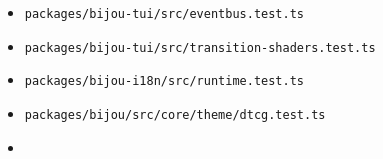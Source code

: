 \begin{itemize}
\begin{itemize}
  \item
    \texttt{p\allowbreak{}a\allowbreak{}c\allowbreak{}k\allowbreak{}a\allowbreak{}g\allowbreak{}e\allowbreak{}s\allowbreak{}/\allowbreak{}b\allowbreak{}i\allowbreak{}j\allowbreak{}o\allowbreak{}u\allowbreak{}-\allowbreak{}t\allowbreak{}u\allowbreak{}i\allowbreak{}/\allowbreak{}s\allowbreak{}r\allowbreak{}c\allowbreak{}/\allowbreak{}e\allowbreak{}v\allowbreak{}e\allowbreak{}n\allowbreak{}t\allowbreak{}b\allowbreak{}u\allowbreak{}s\allowbreak{}.\allowbreak{}t\allowbreak{}e\allowbreak{}s\allowbreak{}t\allowbreak{}.\allowbreak{}t\allowbreak{}s}
  \item
    \texttt{p\allowbreak{}a\allowbreak{}c\allowbreak{}k\allowbreak{}a\allowbreak{}g\allowbreak{}e\allowbreak{}s\allowbreak{}/\allowbreak{}b\allowbreak{}i\allowbreak{}j\allowbreak{}o\allowbreak{}u\allowbreak{}-\allowbreak{}t\allowbreak{}u\allowbreak{}i\allowbreak{}/\allowbreak{}s\allowbreak{}r\allowbreak{}c\allowbreak{}/\allowbreak{}t\allowbreak{}r\allowbreak{}a\allowbreak{}n\allowbreak{}s\allowbreak{}i\allowbreak{}t\allowbreak{}i\allowbreak{}o\allowbreak{}n\allowbreak{}-\allowbreak{}s\allowbreak{}h\allowbreak{}a\allowbreak{}d\allowbreak{}e\allowbreak{}r\allowbreak{}s\allowbreak{}.\allowbreak{}t\allowbreak{}e\allowbreak{}s\allowbreak{}t\allowbreak{}.\allowbreak{}t\allowbreak{}s}
  \item
    \texttt{p\allowbreak{}a\allowbreak{}c\allowbreak{}k\allowbreak{}a\allowbreak{}g\allowbreak{}e\allowbreak{}s\allowbreak{}/\allowbreak{}b\allowbreak{}i\allowbreak{}j\allowbreak{}o\allowbreak{}u\allowbreak{}-\allowbreak{}i\allowbreak{}1\allowbreak{}8\allowbreak{}n\allowbreak{}/\allowbreak{}s\allowbreak{}r\allowbreak{}c\allowbreak{}/\allowbreak{}r\allowbreak{}u\allowbreak{}n\allowbreak{}t\allowbreak{}i\allowbreak{}m\allowbreak{}e\allowbreak{}.\allowbreak{}t\allowbreak{}e\allowbreak{}s\allowbreak{}t\allowbreak{}.\allowbreak{}t\allowbreak{}s}
  \item
    \texttt{p\allowbreak{}a\allowbreak{}c\allowbreak{}k\allowbreak{}a\allowbreak{}g\allowbreak{}e\allowbreak{}s\allowbreak{}/\allowbreak{}b\allowbreak{}i\allowbreak{}j\allowbreak{}o\allowbreak{}u\allowbreak{}/\allowbreak{}s\allowbreak{}r\allowbreak{}c\allowbreak{}/\allowbreak{}c\allowbreak{}o\allowbreak{}r\allowbreak{}e\allowbreak{}/\allowbreak{}t\allowbreak{}h\allowbreak{}e\allowbreak{}m\allowbreak{}e\allowbreak{}/\allowbreak{}d\allowbreak{}t\allowbreak{}c\allowbreak{}g\allowbreak{}.\allowbreak{}t\allowbreak{}e\allowbreak{}s\allowbreak{}t\allowbreak{}.\allowbreak{}t\allowbreak{}s}
  \item

\end{itemize}
\end{itemize}

